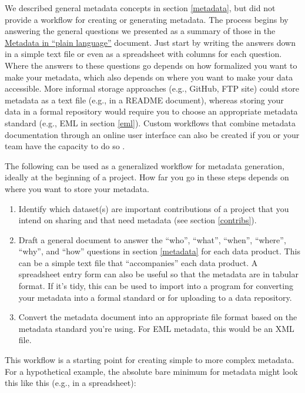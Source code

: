 \documentclass[
]{book}
\providecommand{\tightlist}{%
  \setlength{\itemsep}{0pt}\setlength{\parskip}{0pt}}
\begin{document}
We described general metadata concepts in section \ref{metadata}, but did not provide a workflow for creating or generating metadata. The process begins by answering the general questions we presented as a summary of those in the \href{https://prd-wret.s3.us-west-2.amazonaws.com/assets/palladium/production/atoms/files/Metadata\%20in\%20Plain\%20Language_508compliant.pdf}{Metadata in ``plain language''} document. Just start by writing the answers down in a simple text file or even as a spreadsheet with columns for each question. Where the answers to these questions go depends on how formalized you want to make your metadata, which also depends on where you want to make your data accessible. More informal storage approaches (e.g., GitHub, FTP site) could store metadata as a text file (e.g., in a README document), whereas storing your data in a formal repository would require you to choose an appropriate metadata standard (e.g., EML in section \ref{eml}). Custom workflows that combine metadata documentation through an online user interface can also be created if you or your team have the capacity to do so \citep{Jones07}.

The following can be used as a generalized workflow for metadata generation, ideally at the beginning of a project. How far you go in these steps depends on where you want to store your metadata.

\begin{enumerate}
\def\labelenumi{\arabic{enumi}.}
\tightlist
\item
  Identify which dataset(s) are important contributions of a project that you intend on sharing and that need metadata (see section \ref{contribs}).
\item
  Draft a general document to answer the ``who'', ``what'', ``when'', ``where'', ``why'', and ``how'' questions in section \ref{metadata} for each data product. This can be a simple text file that ``accompanies'' each data product. A spreadsheet entry form can also be useful so that the metadata are in tabular format. If it's tidy, this can be used to import into a program for converting your metadata into a formal standard or for uploading to a data repository.
\item
  Convert the metadata document into an appropriate file format based on the metadata standard you're using. For EML metadata, this would be an XML file.
\end{enumerate}

This workflow is a starting point for creating simple to more complex metadata. For a hypothetical example, the absolute bare minimum for metadata might look this like this (e.g., in a spreadsheet):
\end{document}
